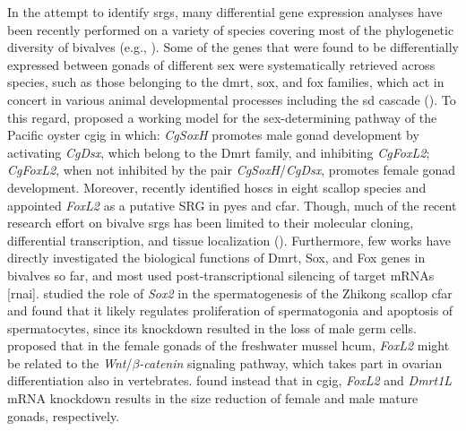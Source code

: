 In the attempt to identify \glspl{srg}, many differential gene expression analyses have been recently performed on a variety of species covering most of the phylogenetic diversity of bivalves (e.g., \textbf{\cite{milani2013nuclear,zhang2014genomic,chen2017transcriptome,capt2018deciphering,ghiselli2018comparative,shi2018proteome}}). Some of the genes that were found to be differentially expressed between gonads of different sex were systematically retrieved across species, such as those belonging to the \gls{dmrt}, \gls{sox}, and \gls{fox} families, which act in concert in various animal developmental processes including the \gls{sd} cascade (\textbf{\cite{marshall2010homologies,beukeboom2014evolution}}). To this regard, \textbf{\cite{zhang2014genomic}} proposed a working model for the sex-determining pathway of the Pacific oyster \gls{cgig} in which: \textit{CgSoxH} promotes male gonad development by activating \textit{CgDsx}, which belong to the Dmrt family, and inhibiting \textit{CgFoxL2}; \textit{CgFoxL2}, when not inhibited by the pair \textit{CgSoxH}/\textit{CgDsx}, promotes female gonad development. Moreover, \textbf{\cite{han2022ancient}} recently identified \glspl{hosc} in eight scallop species and appointed \textit{FoxL2} as a putative SRG in \gls{pyes} and \gls{cfar}. Though, much of the recent research effort on bivalve \glspl{srg} has been limited to their molecular cloning, differential transcription, and tissue localization (\textbf{\cite{liang2019sox2,sun2022examination}}). Furthermore, few works have directly investigated the biological functions of Dmrt, Sox, and Fox genes in bivalves so far, and most used post-transcriptional silencing of target mRNAs [\gls{rnai}]. \textbf{\cite{liang2019sox2}} studied the role of \textit{Sox2} in the spermatogenesis of the Zhikong scallop \gls{cfar} and found that it likely regulates proliferation of spermatogonia and apoptosis of spermatocytes, since its knockdown resulted in the loss of male germ cells. \textbf{\cite{wang2020identification}} proposed that in the female gonads of the freshwater mussel \gls{hcum}, \textit{FoxL2} might be related to the \textit{Wnt}/\textit{$\beta$-catenin} signaling pathway, which takes part in ovarian differentiation also in vertebrates. \textbf{\cite{sun2022examination}} found instead that in \gls{cgig}, \textit{FoxL2} and \textit{Dmrt1L} mRNA knockdown results  in the size reduction of female and male mature gonads, respectively.

